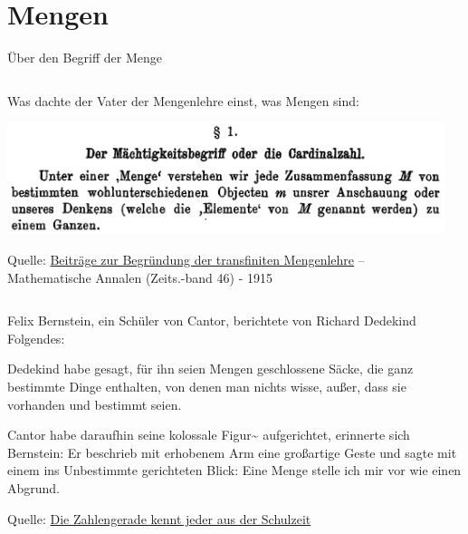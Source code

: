 \documentclass[12pt,ngerman,a4paper,ignorenonframetext,]{beamer}
\begin{document}
\hypertarget{mengen}{%
\section{Mengen}\label{mengen}}

\begin{frame}{Über den Begriff der Menge}
\protect\hypertarget{uber-den-begriff-der-menge}{}


\begin{columns}[T]
	\begin{column}[t]{0.74\textwidth}

Was dachte der Vater der Mengenlehre einst, was Mengen sind:

\begin{center}\includegraphics[width=0.95\linewidth]{./images/MGWI/TextstelleMitDerMengendefinitionVonGeorgCantor} \end{center}

{\tiny{}

Quelle: \href{http://bit.ly/1QSwuoV}{Beiträge zur Begründung der
transfiniten Mengenlehre} -- Mathematische Annalen (Zeits.-band 46) -
1915

}


	\end{column}
	\begin{column}[t]{0.24\textwidth}
	\end{column}
\end{columns}


\begin{Bemerkungen}[]

{\scriptsize{}

Felix Bernstein, ein Schüler von Cantor, berichtete von Richard Dedekind
Folgendes:

Dedekind habe gesagt, für ihn seien Mengen \glqq geschlossene Säcke, die
ganz bestimmte Dinge enthalten, von denen man nichts wisse, außer, dass
sie vorhanden und bestimmt seien\grqq.

Cantor habe daraufhin \glqq seine kolossale Figur\grqq\textasciitilde{}
aufgerichtet, erinnerte sich Bernstein: \glqq Er beschrieb mit erhobenem
Arm eine großartige Geste und sagte mit einem ins Unbestimmte
gerichteten Blick: \glq Eine Menge stelle ich mir vor wie einen
Abgrund.\grq \grqq

{{\tiny{}Quelle: \href{http://bit.ly/1KFCxwf}{Die Zahlengerade kennt
jeder aus der Schulzeit}}}

}

\end{Bemerkungen}

\end{frame}
\end{document}
